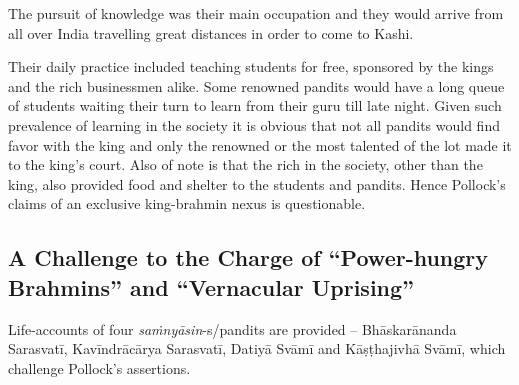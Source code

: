 The pursuit of knowledge was their main occupation and they would arrive from all over India travelling great distances in order to come to Kashi.

Their daily practice included teaching students for free, sponsored by the kings and the rich businessmen alike. Some renowned pandits would have a long queue of students waiting their turn to learn from their guru till late night. Given such prevalence of learning in the society it is obvious that not all pandits would find favor with the king and only the renowned or the most talented of the lot made it to the king’s court. Also of note is that the rich in the society, other than the king, also provided food and shelter to the students and pandits. Hence Pollock’s claims of an exclusive king-brahmin nexus is questionable.

\newpage

\subsection*{A Challenge to the Charge of \hfill\break “Power-hungry Brahmins” and “Vernacular Uprising”}

Life-accounts of four \textit{saṁnyāsin}-s/pandits are provided – Bhāskarānanda Sarasvatī, Kavīndrācārya Sarasvatī, Datiyā Svāmī and Kāṣṭhajivhā Svāmī, which challenge Pollock’s assertions.

